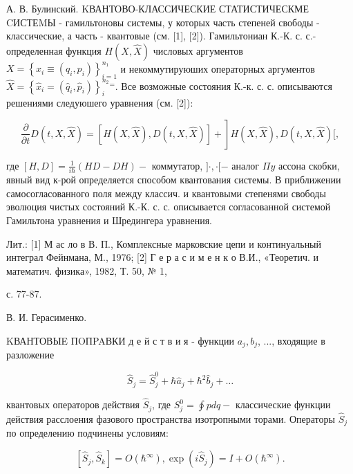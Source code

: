 \documentclass[10pt]{article}
\begin{document}
А. В. Булинский. KВАНТОВО-КЛАССИЧЕСКИЕ СТАТИСТИЧЕСКМЕ CИСТЕMЫ - гамильтоновы системы, у которых часть степеней свободы - классические, а часть - квантовые (см. [1], [2]). Гамильтониан К.-К. с. с.- определенная функция $H(X, \hat{X})$ числовых аргументов $X=\left\{x_{i} \equiv\left(q_{i}, p_{i}\right)\right\}_{i=1}^{n_{1}}$ и некоммутируюших операторных аргументов $\hat{X}=\left\{\hat{x}_{i}=\left(\hat{q}_{i}, \hat{p}_{i}\right)\right\}_{i}^{n_{2}}{ }^{=}$. Все возможные состояния К.-к. с. с. описываются решениями следуюшего уравнения (см. [2]):



\[

\left.\frac{\partial}{\partial t} D(t, X, \hat{X})=[H(X, \hat{X}), D(t, X, \hat{X})]+\right] H(X, \hat{X}), D(t, X, \hat{X})[,

\]



где $[H, D]=\frac{1}{i \hbar}(H D-D H)-$ коммутатор, $] \cdot, \cdot[-$ аналог $\Pi y$ ассона скобки, явный вид к-рой определяется способом квантования системы. В приближении самосогласованного поля между классич. и квантовыми степенями свободы эволюция чистых состояний К.-К. с. с. описывается согласованной системой Гамильтона уравнения и Шредингера уравнения.



Лит.: [1] М ас ло в В. П., Комплексные марковские цепи и континуальный интеграл Фейнмана, М., 1976; [2] Г е р а с и м е н к о В.И., «Теоретич. и математич. физика», 1982, Т. 50, № 1,

с. 77-87.

В. И. Герасименко.



KВАНТОВЫE ПOПPAВКИ д е й с т в и я - функции $a_{j}, b_{j}$, ..., входящие в разложение



\[

\hat{S}_{j}=\hat{S}_{j}^{0}+\hbar \hat{a}_{j}+\hbar^{2} \hat{b}_{j}+\ldots

\]



квантовых операторов действия $\hat{S}_{j}$, где $S_{j}^{0}=\oint p d q-$ классические функции действия расслоения фазового пространства изотропными торами. Операторы $\hat{S}_{j}$ по определению подчинены условиям:



\[

\left[\hat{S}_{j}, \hat{S}_{k}\right]=O\left(\hbar^{\infty}\right), \exp \left(i \hat{S}_{j}\right)=I+O\left(\hbar^{\infty}\right) .

\]
\end{document}
